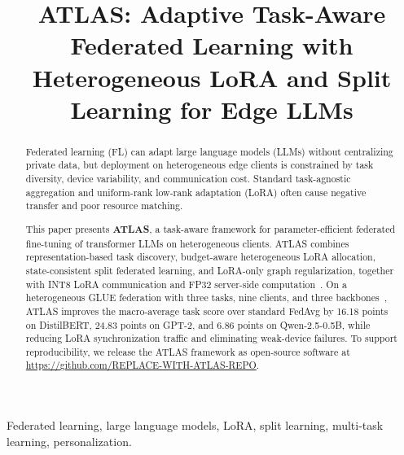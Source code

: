 \documentclass[conference]{IEEEtran}
\begin{document}
\title{ATLAS: Adaptive Task-Aware Federated Learning with Heterogeneous LoRA and Split Learning for Edge LLMs}

\author{
}

\maketitle

\begin{abstract}
Federated learning (FL) can adapt large language models (LLMs) without centralizing private data, but deployment on heterogeneous edge clients is constrained by task diversity, device variability, and communication cost. Standard task-agnostic aggregation and uniform-rank low-rank adaptation (LoRA) often cause negative transfer and poor resource matching.

This paper presents \textbf{ATLAS}, a task-aware framework for parameter-efficient federated fine-tuning of transformer LLMs on heterogeneous clients. ATLAS combines representation-based task discovery, budget-aware heterogeneous LoRA allocation, state-consistent split federated learning, and LoRA-only graph regularization, together with INT8 LoRA communication and FP32 server-side computation~\cite{mira,splitfed,llm_int8,qlora,zeroquant,smoothquant}. On a heterogeneous GLUE federation with three tasks, nine clients, and three backbones~\cite{glue}, ATLAS improves the macro-average task score over standard FedAvg by 16.18 points on DistilBERT, 24.83 points on GPT-2, and 6.86 points on Qwen-2.5-0.5B, while reducing LoRA synchronization traffic and eliminating weak-device failures.
To support reproducibility, we release the ATLAS framework as open-source software at \url{https://github.com/REPLACE-WITH-ATLAS-REPO}.
\end{abstract}

\begin{IEEEkeywords}
Federated learning, large language models, LoRA, split learning, multi-task learning, personalization.
\end{IEEEkeywords}
\end{document}

